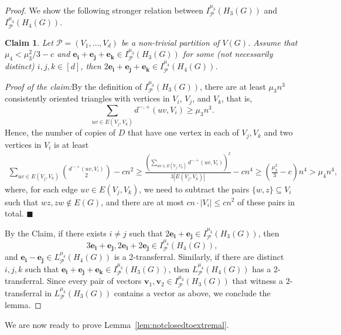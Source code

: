 \documentclass[11pt]{amsart}
\newtheorem*{claim*}{Claim}
\newcommand{\CP}{\mathcal{P}}
\newenvironment{claimproof}[1]{\par\noindent\textit{Proof of the claim:}\space#1}{\leavevmode\unskip\penalty9999 \hbox{}\nobreak\hfill\quad\hbox{$\blacksquare$}}
\begin{document}
\begin{proof}
We show the following stronger relation between $I_\CP^{\mu_3}(H_3(G))$ and $I_\CP^{\mu_4}(H_4(G))$.

\begin{claim*}
    Let $\CP = (V_1, \dots, V_d)$ be a non-trivial partition of $V(G)$. Assume that $\mu_4 < \mu_3^2/3 - c$ and $\mathbf{e_i}+\mathbf{e_j}+\mathbf{e_k} \in I_\CP^{\mu_3}(H_3(G))$ for some (not necessarily distinct) $i,j,k \in [d]$, then $2\mathbf{e_i}+\mathbf{e_j}+\mathbf{e_k} \in I_\CP^{\mu_4}(H_4(G))$.
\end{claim*}

\begin{claimproof}
    By the definition of $I_\CP^{\mu_3}(H_3(G))$, there are at least $\mu_3 n^3$ consistently oriented triangles with vertices in $V_i$, $V_j$, and $V_k$, that is,
    $$\sum_{uv\in E(V_j,V_k)}d^{-,+}(uv,V_i)\ge \mu_3 n^3.$$
    Hence, the number of copies of $D$ that have one vertex in each of $V_j,V_k$ and two vertices in $V_i$ is at least
    \begin{align*}
        \sum_{uv\in E(V_j,V_k)}\binom{d^{-,+}(uv,V_i)}{2}-cn^2 \ge \frac{\left(\sum_{uv\in E(V_j,V_k)}d^{-,+}(uv,V_i)\right)^2}{3|E(V_j,V_k)|}-cn^4 \ge \left( \frac{\mu_3^2}{3} - c \right) n^4>\mu_4 n^4,
    \end{align*}
    where, for each edge $uv\in E(V_j,V_k)$, we need to subtract the pairs $\{w, z\}\subseteq V_i$ such that $wz,zw\not\in E(G)$, and there are at most $cn\cdot |V_i| \le cn^2$ of these pairs in total.
\end{claimproof}
    
    By the Claim, if there exists $i \neq j$ such that $2\mathbf{e_i}+\mathbf{e_j} \in I_\CP^{\mu_3}(H_3(G))$, then $$3\mathbf{e_i}+\mathbf{e_j}, 2\mathbf{e_i}+2\mathbf{e_j} \in I_\CP^{\mu_4}(H_4(G)),$$
    and $\mathbf{e_i}-\mathbf{e_j} \in L_\CP^{\mu_4}(H_4(G))$ is a 2-transferral.
    Similarly, if there are distinct $i,j,k$ such that $\mathbf{e_i}+\mathbf{e_j}+\mathbf{e_k} \in I_\CP^{\mu_3}(H_3(G))$, then $L_\CP^{\mu_4}(H_4(G))$ has a 2-transferral.   
    Since every pair of vectors $\textbf{v}_1,\textbf{v}_2\in I_\CP^{\mu_3}(H_3(G))$ that witness a $2$-transferral in $L_\CP^{\mu_3}(H_3(G))$ contains a vector as above, we conclude the lemma. 
\end{proof}

We are now ready to prove Lemma~\ref{lem:notclosedtoextremal}.
\end{document}
